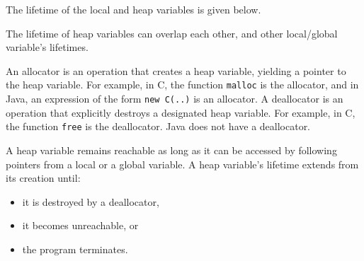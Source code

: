 \documentclass[a4paper, openany]{memoir}
\begin{document}
The lifetime of the local and heap variables is given below.
\begin{figure}[H]
    \centering
\end{figure}
\noindent The lifetime of heap variables can overlap each other, and other local/global variable's lifetimes.

An allocator is an operation that creates a heap variable, yielding a pointer to the heap variable. For example, in C, the function \texttt{malloc} is the allocator, and in Java, an expression of the form \texttt{new C(..)} is an allocator. A deallocator is an operation that explicitly destroys a designated heap variable. For example, in C, the function \texttt{free} is the deallocator. Java does not have a deallocator.

A heap variable remains reachable as long as it can be accessed by following pointers from a local or a global variable. A heap variable's lifetime extends from its creation until:
\begin{itemize}
    \item it is destroyed by a deallocator,
    \item it becomes unreachable, or
    \item the program terminates.
\end{itemize}
\end{document}
